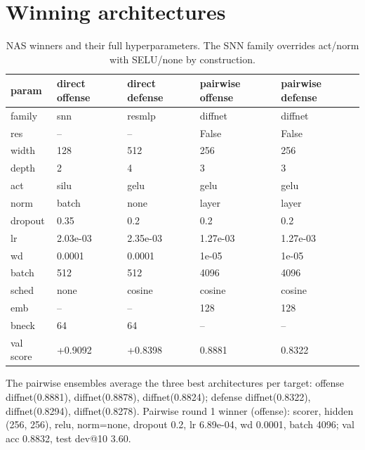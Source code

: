\documentclass[10pt]{article}
\begin{document}
\section{Winning architectures}
\begin{table}[ht]\centering\small\caption{NAS winners and their full hyperparameters. The SNN family overrides act/norm with SELU/none by construction.}\begin{tabular}{lllll}\toprule
param & direct offense & direct defense & pairwise offense & pairwise defense \\
\midrule
family & snn & resmlp & diffnet & diffnet \\
res & -- & -- & False & False \\
width & 128 & 512 & 256 & 256 \\
depth & 2 & 4 & 3 & 3 \\
act & silu & gelu & gelu & gelu \\
norm & batch & none & layer & layer \\
dropout & 0.35 & 0.2 & 0.2 & 0.2 \\
lr & 2.03e-03 & 2.35e-03 & 1.27e-03 & 1.27e-03 \\
wd & 0.0001 & 0.0001 & 1e-05 & 1e-05 \\
batch & 512 & 512 & 4096 & 4096 \\
sched & none & cosine & cosine & cosine \\
emb & -- & -- & 128 & 128 \\
bneck & 64 & 64 & -- & -- \\
val score & +0.9092 & +0.8398 & 0.8881 & 0.8322 \\
\bottomrule\end{tabular}\end{table}
The pairwise ensembles average the three best architectures per target: offense diffnet(0.8881), diffnet(0.8878), diffnet(0.8824); defense diffnet(0.8322), diffnet(0.8294), diffnet(0.8278). Pairwise round 1 winner (offense): scorer, hidden (256, 256), relu, norm=none, dropout 0.2, lr 6.89e-04, wd 0.0001, batch 4096; val acc 0.8832, test dev@10 3.60.
\end{document}
